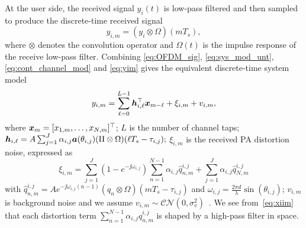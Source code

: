 \documentclass[10pt,twocolumn,twoside]{IEEEtran}
\newtheorem{Asm}{Assumption}
\begin{document}
At the user side,
the received signal $y_i(t)$ is low-pass filtered and then sampled to produce the discrete-time received signal
\begin{equation}\label{eq:yim}
	y_{i,m} = (y_i \otimes \Omega)(mT_s), %
\end{equation}
where
$\otimes$ denotes the convolution operator and
$\Omega(t)$ is the impulse response of the receive low-pass filter.
Combining \eqref{eq:OFDM_sig}, \eqref{eq:sys_mod_unt}, \eqref{eq:cont_channel_mod} and \eqref{eq:yim} gives the equivalent discrete-time system model
\begin{equation}\label{eq:dist_time_mod}
y_{i,m} = \sum_{\ell=0}^{L-1} {\bm h}_{i,\ell}^\top  {\bm x}_{m-\ell} + \xi_{i,m} +  v_{i,m},
\end{equation}
where
${\bm x}_m = [x_{1,m},\dots,x_{N,m}]^\top$;
$L$ is the number of channel taps;
$
{\bm h}_{i,\ell} = A\sum_{j=1}^J \alpha_{i,j} {\bm a}(\theta_{i,j})  (\Pi \otimes \Omega)(\ell T_s - \tau_{i,j});
$
$\xi_{i,m}$ is the received PA distortion noise, expressed as
\begin{equation}\label{eq:xiim}
\xi_{i,m} =   \sum_{j=1}^J   (1-e^{-\jj \omega_{i,j}})  \sum_{n=1}^{N-1} \alpha_{i,j} \hat q_{n,m}^{i,j}   +  \sum_{j=1}^J \alpha_{i,j}\hat q_{N,m}^{i,j}
\end{equation}
with $\hat q_{n,m}^{i,j} = A  e^{-\jj \omega_{i,j}(n-1)} (q_n \otimes \Omega)(mT_s-\tau_{i,j})$ and
$\omega_{i,j} = \frac{2\pi d}{\lambda} \sin(\theta_{i,j})$;
$v_{i,m}$ is background noise and we assume $v_{i,m} \sim \mathcal{CN}(0,\sigma_v^2)$~\cite{tse2005fundamentals}.
We see from~\eqref{eq:xiim} that each distortion term $\sum_{n=1}^{N-1} \alpha_{i,j} \hat q_{n,m}^{i,j}$ is shaped by a high-pass filter in space.



%
%
%
%
\end{document}
